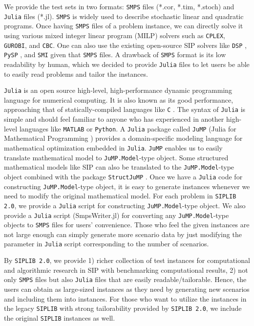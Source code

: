 We provide the test sets in two formats: \texttt{SMPS} files (*.cor, *.tim, *.stoch) and \texttt{Julia} files (*.jl). \texttt{SMPS} is widely used to describe stochastic linear and quadratic programs. Once having \texttt{SMPS} files of a problem instance, we can directly solve it using various mixed integer linear program (MILP) solvers such as \texttt{CPLEX}, \texttt{GUROBI}, and \texttt{CBC}. One can also use the existing open-source SIP solvers like \texttt{DSP} \cite{journal:KZ2015}, \texttt{PySP} \cite{journal:WWH2012}, and \texttt{SMI} \cite{web:SMI} given that \texttt{SMPS} files. A drawback of \texttt{SMPS} format is its low readability by human, which we decided to provide \texttt{Julia} files to let users be able to easily read problems and tailor the instances.

\texttt{Julia} is an open source high-level, high-performance dynamic programming language for numerical computing. It is also known as its good performance, approaching that of statically-compiled languages like \texttt{C} \cite{journal:BEKS2017}. The syntax of \texttt{Julia} is simple and should feel familiar to anyone who has experienced in another high-level languages like \texttt{MATLAB} or \texttt{Python}. A \texttt{Julia} package called \texttt{JuMP} (Julia for Mathematical Programming \cite{web:JuMP}) provides a domain-specific modeling language for mathematical optimization embedded in \texttt{Julia}. \texttt{JuMP} enables us to easily translate mathematical model to \texttt{JuMP.Model}-type object. Some structured mathematical models like SIP can also be translated to the \texttt{JuMP.Model}-type object combined with the package \texttt{StructJuMP} \cite{web:StructJuMP}. Once we have a \texttt{Julia} code for constructing \texttt{JuMP.Model}-type object, it is easy to generate instances whenever we need to modify the original mathematical model. For each problem in \texttt{SIPLIB 2.0}, we provide a \texttt{Julia} script for constructing \texttt{JuMP.Model}-type object. We also provide a \texttt{Julia} script (SmpsWriter.jl) for converting any \texttt{JuMP.Model}-type objects to \texttt{SMPS} files for users' convenience. Those who feel the given instances are not large enough can simply generate more scenario data by just modifying the parameter in \texttt{Julia} script corresponding to the number of scenarios.

By \texttt{SIPLIB 2.0}, we provide 1) richer collection of test instances for computational and algorithmic research in SIP with benchmarking computational results, 2) not only \texttt{SMPS} files but also \texttt{Julia} files that are easily readable/tailorable. Hence, the users can obtain as large-sized instances as they need by generating new scenarios and including them into instances. For those who want to utilize the instances in the legacy \texttt{SIPLIB} with strong tailorability provided by \texttt{SIPLIB 2.0}, we include the original \texttt{SIPLIB} instances as well.

